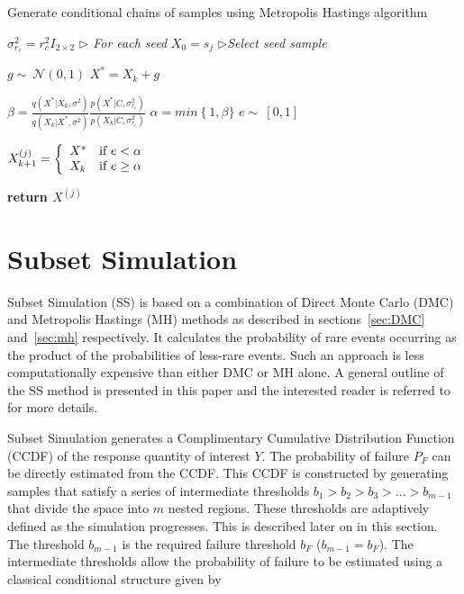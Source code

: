 \documentclass[journal]{IEEEtran}
\begin{document}
\begin{algorithm}\caption{Generate conditional chains of samples using Metropolis Hastings algorithm}
\label{alg:mh}
\begin{algorithmic}[1]
	\State $\sigma_{r_{c}}^{2} = r_{c}^{2} I_{2 \times 2}$
	 \textit{$\triangleright$ For each seed}	
		\State $X_{0} = s_{j}$	\textit{$\triangleright$Select seed sample}
			
			\State $g \sim{~} \mathcal{N}(0,1)$
			\State $X^{*} = X_{k} + g$
			

			\State $\beta = \frac{q(X^{*}|X_{k}, \sigma^{2})}{q(X_{k}|X^{*},\sigma^{2})}\frac{p(X^{*}|C, \sigma_{r_{c}}^{2})}{p(X_{k}|C, \sigma_{r_{c}}^{2})}$
			\State $\alpha = min \left \{ 1, \beta\} \right. $
			\State $e \sim{~} [0,1]$
			
\State $X_{k+1}^{(j)} = \left \{ \begin{array}{l l}
												X^{*} & \text{if} \ e < \alpha \\
												X_{k} & \text{if} \ e \geq \alpha \\
										  \end{array} \right .$
		\EndFor	
	\EndFor

\State \textbf{return $X^{(j)}$}

\EndFunction
\end{algorithmic}
\end{algorithm}

\section{Subset Simulation}
\label{sec:SS}
Subset Simulation (SS) is based on a combination of Direct Monte Carlo (DMC) and Metropolis Hastings (MH) methods as described in sections~\ref{sec:DMC} and~\ref{sec:mh} respectively. It calculates the probability of rare events occurring as the product of the probabilities of less-rare events. Such an approach is less computationally expensive than either DMC or MH alone. A general outline of the SS method is presented in this paper and the interested reader is referred to~\cite{IVAN} for more details.

Subset Simulation generates a Complimentary Cumulative Distribution Function (CCDF) of the response quantity of interest $Y$. The probability of failure $P_{F}$ can be directly estimated from the CCDF. This CCDF is constructed by generating samples that satisfy a series of intermediate thresholds $b_{1} > b_{2} > b_{3} > ... > b_{m-1}$ that divide the space into $m$ nested regions. These thresholds are adaptively defined as the simulation progresses. This is described later on in this section. The threshold $b_{m-1}$ is the required failure threshold $b_{F}$ ($b_{m-1} = b_{F}$). The intermediate thresholds allow the probability of failure to be estimated using a classical conditional structure given by
\end{document}
